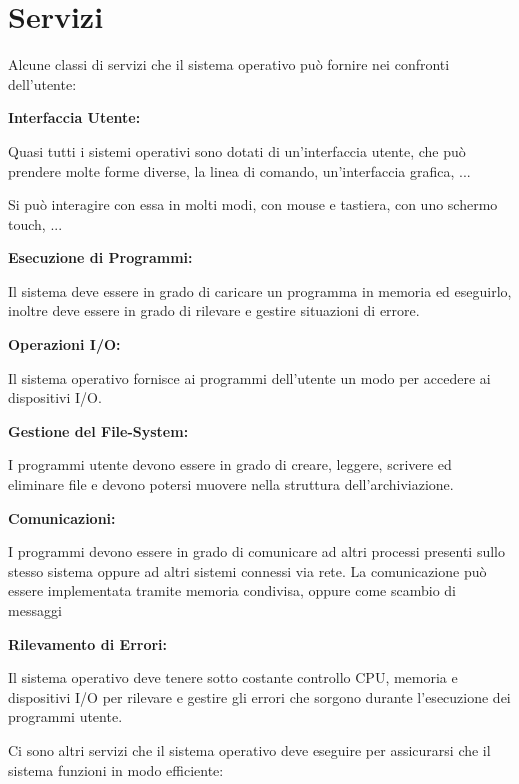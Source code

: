 \section{Servizi}

Alcune classi di servizi che il sistema operativo può fornire nei confronti dell'utente:
\begin{sitemize}
    \item \textbf{Interfaccia Utente:}

    Quasi tutti i sistemi operativi sono dotati di un'interfaccia utente, che può prendere molte forme diverse, la linea di comando, un'interfaccia grafica, ...

    Si può interagire con essa in molti modi, con mouse e tastiera, con uno schermo touch, ...

    \item \textbf{Esecuzione di Programmi:}

    Il sistema deve essere in grado di caricare un programma in memoria ed eseguirlo, inoltre deve essere in grado di rilevare e gestire situazioni di errore.

    \item \textbf{Operazioni I/O:}

    Il sistema operativo fornisce ai programmi dell'utente un modo per accedere ai dispositivi I/O.

    \item \textbf{Gestione del File-System:}

    I programmi utente devono essere in grado di creare, leggere, scrivere ed eliminare file e devono potersi muovere nella struttura dell'archiviazione.

    \item \textbf{Comunicazioni:}

    I programmi devono essere in grado di comunicare ad altri processi presenti sullo stesso sistema oppure ad altri sistemi connessi via rete.
    La comunicazione può essere implementata tramite memoria condivisa, oppure come scambio di messaggi

    \item \textbf{Rilevamento di Errori:}

    Il sistema operativo deve tenere sotto costante controllo CPU, memoria e dispositivi I/O per rilevare e gestire gli errori che sorgono durante l'esecuzione dei programmi utente.
\end{sitemize}

\spacer
Ci sono altri servizi che il sistema operativo deve eseguire per assicurarsi che il sistema funzioni in modo efficiente:

